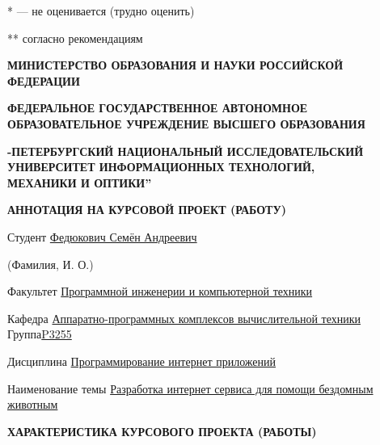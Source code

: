 \documentclass[12pt]{article}
\begin{document}
* --- не оценивается (трудно оценить)

** согласно рекомендациям
\newpage
\begin{center}
\bigskip\bigskip\bigskip\bigskip\bigskip\bigskip\bigskip\bigskip\bigskip\bigskip\bigskip\bigskip\bigskip\bigskip\bigskip\bigskip\bigskip\bigskip
\normalsize
\textbf{МИНИСТЕРСТВО ОБРАЗОВАНИЯ И НАУКИ РОССИЙСКОЙ ФЕДЕРАЦИИ}

\medskip 
\textbf{ФЕДЕРАЛЬНОЕ ГОСУДАРСТВЕННОЕ АВТОНОМНОЕ ОБРАЗОВАТЕЛЬНОЕ УЧРЕЖДЕНИЕ ВЫСШЕГО ОБРАЗОВАНИЯ}

\medskip 
\textbf{-ПЕТЕРБУРГСКИЙ НАЦИОНАЛЬНЫЙ ИССЛЕДОВАТЕЛЬСКИЙ }
\textbf{УНИВЕРСИТЕТ ИНФОРМАЦИОННЫХ ТЕХНОЛОГИЙ, }\\
\textbf{МЕХАНИКИ И ОПТИКИ\textquotedblright}

\bigskip\bigskip
\textbf{АННОТАЦИЯ НА КУРСОВОЙ ПРОЕКТ (РАБОТУ)}
\bigskip\bigskip

\end{center}

\normalsize \noindent Студент \uline{\hspace{140pt}Федюкович Семён Андреевич\hspace*{\fill}}

\hspace{8cm} \scriptsize (Фамилия, И. О.) 

\normalsize \noindent Факультет \uline{\hspace{80pt}Программной инженерии и компьютерной техники\hspace*{\fill}}

\bigskip
\normalsize \noindent Кафедра \uline{ Аппаратно-программных комплексов вычислительной техники } Группа\uline{\hspace{15pt}P3255\hspace*{\fill}}
\bigskip

\normalsize \noindent Дисциплина \uline{\hspace{90pt}Программирование интернет приложений\hspace*{\fill}}
\bigskip

\normalsize \noindent Наименование темы  \uline{\hspace{20pt}Разработка интернет сервиса для помощи бездомным животным\hspace*{\fill}}

\bigskip\bigskip
\begin{center}
\textbf{ХАРАКТЕРИСТИКА КУРСОВОГО ПРОЕКТА (РАБОТЫ)}
\end{center}
\bigskip\bigskip
\end{document}
